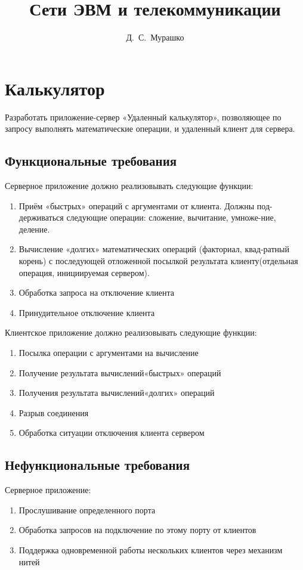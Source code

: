 \documentclass[12pt,a4paper]{report}
\author{Д.~С.~Мурашко}
\title{Сети ЭВМ и телекоммуникации}
\begin{document}
\listoftodos
\maketitle
\chapter{Калькулятор}
Разработать  приложение-сервер «Удаленный  калькулятор», 
позволяющее  по  запросу  выполнять  математические  операции,  и  удаленный клиент для сервера. 
\section{Функциональные требования}
Серверное приложение должно реализовывать следующие функции:
\begin{enumerate}
\item{Приём «быстрых» операций с аргументами от клиента. Должны под-держиваться  следующие  операции:  сложение,  вычитание,  умноже-ние, деление. }
\item{Вычисление «долгих»  математических  операций (факториал,  квад-ратный  корень)  с  последующей  отложенной  посылкой  результата
клиенту(отдельная операция, инициируемая сервером).}
\item{Обработка запроса на отключение клиента}
\item{Принудительное отключение клиента}
\end{enumerate}

Клиентское приложение должно реализовывать следующие функции:
\begin{enumerate}
\item{Посылка операции с аргументами на вычисление}
\item{Получение результата вычислений«быстрых» операций}
\item{Получения результата вычислений«долгих» операций}
\item{Разрыв соединения}
\item{Обработка ситуации отключения клиента сервером}
\end{enumerate}

\section{Нефункциональные требования}
Серверное приложение:
\begin{enumerate}
\item{Прослушивание определенного порта}
\item{Обработка запросов на подключение по этому порту от клиентов}
\item{Поддержка одновременной работы нескольких клиентов через механизм нитей}
\end{enumerate}
\end{document}
